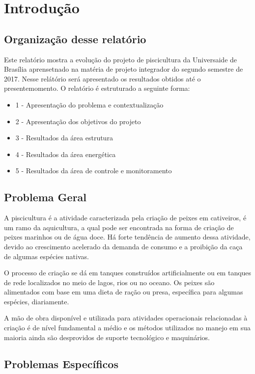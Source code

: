 \chapter[Introdução]{Introdução}\label{cap1}

\section{Organização desse relatório}

Este relatório mostra a evolução do projeto de piscicultura da Universaide de Brasília aprensetnado na matéria de projeto integrador do segundo semestre de 2017. Nesse relátório será apresentado os resultados obtidos até o presentemomento. O relatório é estruturado a seguinte forma:

\begin{itemize}
  \item 1 - Apresentação do problema e contextualização
  \item 2 - Apresentação dos objetivos do projeto
  \item 3 - Resultados da área estrutura
  \item 4 - Resultados da área energética
  \item 5 - Resultados da área de controle e monitoramento
\end{itemize}


\section{Problema Geral}
A piscicultura é a atividade caracterizada pela criação de peixes em cativeiros, é um ramo da aquicultura, a qual pode ser encontrada na forma de criação de peixes marinhos ou de água doce. Há forte tendência de aumento dessa atividade, devido ao crescimento acelerado da demanda de consumo e a proibição da caça de algumas espécies nativas.

O processo de criação se dá em tanques construídos artificialmente ou em tanques de rede localizados no meio de lagos, rios ou no oceano. Os peixes são alimentados com base em uma dieta de ração ou presa, específica para algumas espécies, diariamente.

A mão de obra disponível e utilizada para atividades operacionais relacionadas à criação é de nível fundamental a médio e os métodos utilizados no manejo em sua maioria ainda são desprovidos de suporte tecnológico e maquinários.

\section{Problemas Específicos}

